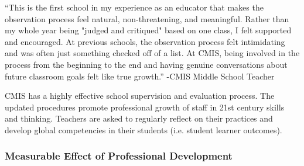 \begin{findings}
``This is the first school in my experience as an educator that makes the observation process feel natural, non-threatening, and meaningful. Rather than my whole year being "judged and critiqued" based on one class, I felt supported and encouraged. At previous schools, the observation process felt intimidating and was often just something checked off of a list. At CMIS, being involved in the process from the beginning to the end and having genuine conversations about future classroom goals felt like true growth.''
                                                                                            -CMIS Middle School Teacher


CMIS has a highly effective school supervision and evaluation process. The updated procedures promote professional growth of staff in 21st century skills and thinking. Teachers are asked to regularly reflect on their practices and develop global competencies in their students (i.e. student learner outcomes). 
\end{findings}

\subsubsection{Measurable Effect of Professional Development}



